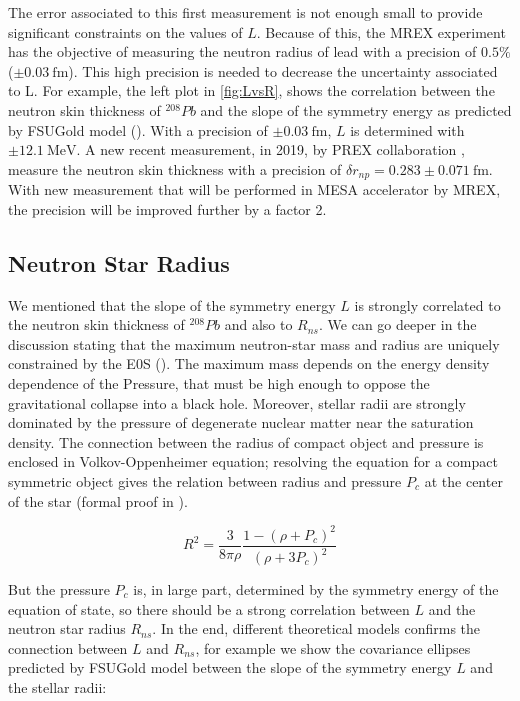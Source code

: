 The error associated to this first measurement is not enough small to provide significant constraints on the values of $L$. Because of this, the MREX experiment has the objective of measuring the neutron radius of lead with a precision of $0.5 \%$  ($\pm \SI{0.03}{\femto \meter}$). This high precision is needed to decrease the uncertainty associated to L. For example, the left plot in \ref{fig:LvsR}, shows the correlation between the neutron skin thickness of $^{208}Pb$ and the slope of the symmetry energy as predicted by FSUGold model (\cite{Fattoyev_2011}). With a precision of $\pm \SI{0.03}{\femto \meter}$, $L$ is determined with $\pm \SI{12.1}{\mega \electronvolt}$. 
A new recent measurement, in 2019, by PREX collaboration \cite{PREX:2021umo}, measure the neutron skin thickness with a precision of $\delta r_{np} = 0.283 \pm 0.071 \SI{}{\femto \meter}$. With new measurement that will be performed in MESA accelerator by MREX, the precision will be improved further by a factor 2.

\subsection{Neutron Star Radius}

We mentioned that the slope of the symmetry energy $L$ is strongly correlated to the neutron skin thickness of $^{208}Pb$ and also to $R_{ns}$. We can go deeper in the discussion stating that the maximum neutron-star mass and radius are uniquely constrained by the E0S (\cite{Lindblom1992DeterminingTN}). The maximum mass depends on the energy density dependence of the Pressure, that must be high enough to oppose the gravitational collapse into a black hole. Moreover, stellar radii are strongly dominated by the pressure of degenerate nuclear matter near the saturation density.  
The connection between the radius of compact object and pressure is enclosed in Volkov-Oppenheimer equation; resolving the equation for a compact symmetric object gives the relation between radius and pressure $P_{c}$ at the center of the star (formal proof in \cite{LATTIMER_2007}).

\begin{equation}
R^{2} = \dfrac{3}{8\pi \rho} \dfrac{1 - (\rho + P_{c})^{2}}{(\rho + 3 P_{c})^{2}}
\end{equation}

But the pressure $P_{c}$ is, in large part, determined by the symmetry energy of the equation of state, so there should be a strong correlation between $L$ and the neutron star radius $R_{ns}$. In the end, different theoretical models \cite{PhysRevLett.95.122501} confirms the connection between $L$ and $R_{ns}$, for example we show the covariance ellipses predicted by FSUGold model between the slope of the symmetry energy $L$ and the stellar radii:

